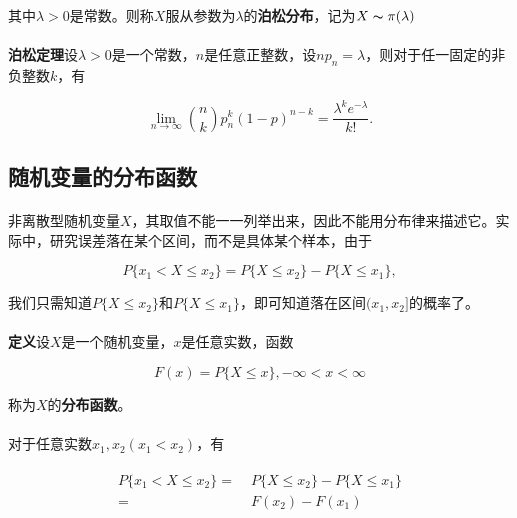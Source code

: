 其中$\lambda > 0$是常数。则称$X$服从参数为$\lambda$的\textbf{泊松分布}，记为$X\thicksim \pi(\lambda)$

\paragraph{}
\textbf{泊松定理\;}设$\lambda>0$是一个常数，$n$是任意正整数，设$np_n=\lambda$，则对于任一固定的非负整数$k$，有

\begin{equation}
  \lim_{n \to \infty} {n \choose k}p_n^k(1-p)^{n-k}=\frac{\lambda^ke^{-\lambda}}{k!}.
\end{equation}

\subsection{随机变量的\textbf{分布函数}}
\paragraph{}
非离散型随机变量$X$，其取值不能一一列举出来，因此不能用分布律来描述它。实际中，研究误差落在某个区间，而不是具体某个样本，由于

\begin{equation}
  P\{x_1<X\leq x_2\} = P\{X\leq x_2\} - P\{X \leq x_1\},
\end{equation}

我们只需知道$P\{X\leq x_2\}$和$P\{X \leq x_1\}$，即可知道落在区间$(x_1,x_2]$的概率了。

\paragraph{}
\textbf{定义\;}设$X$是一个随机变量，$x$是任意实数，函数

\begin{equation}
  F(x) = P\{X \leq x\}, -\infty < x < \infty
\end{equation}

称为$X$的\textbf{分布函数}。

\paragraph{}
对于任意实数$x_1, x_2 (x_1 < x_2)$，有

\begin{align}
  \begin{split}
    P\{x_1 < X \leq x_2\} =&\; P\{X \leq x_2\} - P\{X \leq x_1\} \\
    =&\; F(x_2) - F(x_1)
  \end{split}
\end{align}

